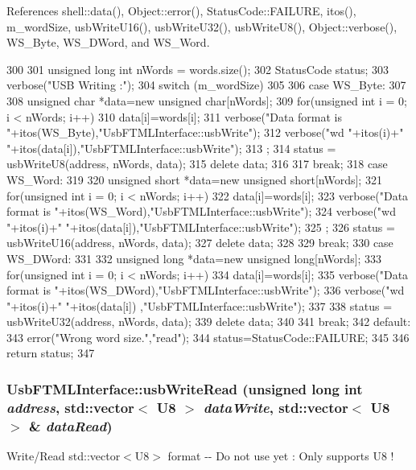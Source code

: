 References shell::data(), Object::error(), StatusCode::FAILURE, itos(), m\_\-wordSize, usbWriteU16(), usbWriteU32(), usbWriteU8(), Object::verbose(), WS\_\-Byte, WS\_\-DWord, and WS\_\-Word.


\begin{DoxyCode}
300 {
301   unsigned long int nWords = words.size();
302   StatusCode status;
303   verbose("USB Writing :");
304   switch (m_wordSize)
305   {
306   case WS_Byte:
307     {
308       unsigned char *data=new unsigned char[nWords];
309       for(unsigned int i = 0; i < nWords; i++){
310         data[i]=words[i];
311         verbose("Data format is "+itos(WS_Byte),"UsbFTMLInterface::usbWrite");
312         verbose("wd "+itos(i)+" "+itos(data[i]),"UsbFTMLInterface::usbWrite");
313       };
314       status = usbWriteU8(address, nWords, data);
315       delete data;
316     }
317     break;
318   case WS_Word:
319     {
320       unsigned short *data=new unsigned short[nWords];
321       for(unsigned int i = 0; i < nWords; i++){
322         data[i]=words[i];
323         verbose("Data format is "+itos(WS_Word),"UsbFTMLInterface::usbWrite");
324         verbose("wd "+itos(i)+" "+itos(data[i]),"UsbFTMLInterface::usbWrite");
325       };
326       status = usbWriteU16(address, nWords, data);
327       delete data;
328     }
329     break;
330   case WS_DWord:
331     {
332       unsigned long *data=new unsigned long[nWords];
333       for(unsigned int i = 0; i < nWords; i++){
334         data[i]=words[i];
335         verbose("Data format is "+itos(WS_DWord),"UsbFTMLInterface::usbWrite");
336         verbose("wd "+itos(i)+" "+itos(data[i]) ,"UsbFTMLInterface::usbWrite");
337       }
338       status = usbWriteU32(address, nWords, data);
339       delete data;
340     }
341     break;
342   default:
343     error("Wrong word size.","read");
344     status=StatusCode::FAILURE;
345   }
346   return status;
347 }
\end{DoxyCode}
\hypertarget{classUsbFTMLInterface_ab3ae56cb732cbb8f38494cd3205a2650}{
\subsubsection[{usbWriteRead}]{ UsbFTMLInterface::usbWriteRead (unsigned long int {\em address}, \/  std::vector$<$ {\bf U8} $>$ {\em dataWrite}, \/  std::vector$<$ {\bf U8} $>$ \& {\em dataRead})}}
\label{classUsbFTMLInterface_ab3ae56cb732cbb8f38494cd3205a2650}
Write/Read std::vector$<$U8$>$ format -\/-\/ Do not use yet : Only supports U8 ! 

